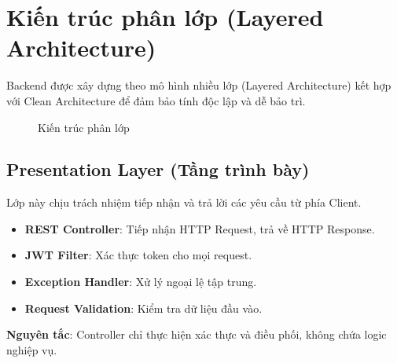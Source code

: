 \documentclass[12pt,a4paper]{report}
\begin{document}
\section{Kiến trúc phân lớp (Layered Architecture)}

Backend được xây dựng theo mô hình nhiều lớp (Layered Architecture) kết hợp với Clean Architecture để đảm bảo tính độc lập và dễ bảo trì.

\begin{figure}[H]
\centering
{}
\caption{Kiến trúc phân lớp}
\label{fig:layer_architecture}
\end{figure}

\subsection{Presentation Layer (Tầng trình bày)}

Lớp này chịu trách nhiệm tiếp nhận và trả lời các yêu cầu từ phía Client.

\begin{itemize}
\item \textbf{REST Controller}: Tiếp nhận HTTP Request, trả về HTTP Response.
\item \textbf{JWT Filter}: Xác thực token cho mọi request.
\item \textbf{Exception Handler}: Xử lý ngoại lệ tập trung.
\item \textbf{Request Validation}: Kiểm tra dữ liệu đầu vào.
\end{itemize}

\textbf{Nguyên tắc}: Controller chỉ thực hiện xác thực và điều phối, không chứa logic nghiệp vụ.
\end{document}
